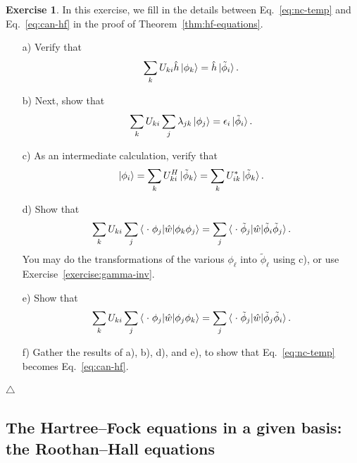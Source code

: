 \documentclass{report}
\theoremstyle{plain}
\theoremstyle{definition}
\newtheorem{exerc}{Exercise}[chapter]
\newcommand\xqed[1]{%
  \leavevmode\unskip\penalty9999 \hbox{}\nobreak\hfill
  \quad\hbox{#1}}
\newcommand\demo{\xqed{$\triangle$}}
\newenvironment{exercise}{\bigskip\begin{exerc}}{\demo\end{exerc}\bigskip}
\begin{document}
\begin{exercise}\label{exercise:can-hf-final-step}
  In this exercise, we fill in the details between Eq.~\eqref{eq:nc-temp} and
  Eq.~\eqref{eq:can-hf} in the proof of
  Theorem~\ref{thm:hf-equations}.
  \begin{enumerate}
    \item[a)] 
      Verify that
      \begin{equation}
        \sum_k U_{ki} \hat{h}\ket{\phi_k} = \hat{h}\ket{\tilde{\phi}_i}.
      \end{equation}
    \item[b)]
      Next, show that
      \begin{equation}
        \sum_k U_{ki} \sum_{j} \lambda_{jk}\ket{\phi_j} = \epsilon_i
        \ket{\tilde{\phi}_i} .
      \end{equation}
    \item[c)]
      As an intermediate calculation, verify that
      \begin{equation}
        \ket{\phi_i} = \sum_k U^H_{ki} \ket{\tilde{\phi}_k} = \sum_k U^*_{ik} \ket{\tilde{\phi}_k}.
      \end{equation}
    \item[d)]
      Show that 
      \begin{equation}
        \sum_k U_{ki} \sum_j
         \braket{\;\cdot\;\phi_j|\hat{w}|\phi_k\phi_j} =  \sum_j
         \braket{\;\cdot\;\tilde{\phi}_j|\hat{w}|\tilde{\phi}_i\tilde{\phi}_j}
         .
       \end{equation}
       You may do the transformations of the various $\phi_\ell$ into 
       $\tilde{\phi}_\ell$ using c), or use Exercise~\ref{exercise:gamma-inv}.
    \item[e)]
      Show that 
      \begin{equation}
        \sum_k U_{ki} \sum_j
         \braket{\;\cdot\;\phi_j|\hat{w}|\phi_j\phi_k} =  \sum_j
         \braket{\;\cdot\;\tilde{\phi}_j|\hat{w}|\tilde{\phi}_j\tilde{\phi}_i}
         .
       \end{equation}
       \item[f)]
         Gather the results of a), b), d), and e), to show that
         Eq.~\eqref{eq:nc-temp} becomes Eq.~\eqref{eq:can-hf}.
     \end{enumerate}      
\end{exercise}


\subsection{The Hartree--Fock equations in a given basis: the
  Roothan--Hall equations}
\end{document}
